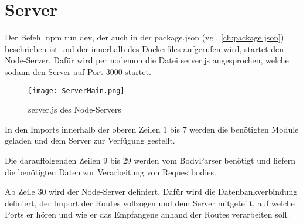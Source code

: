 
\chapter{Server}
\label{ch:Server}

Der Befehl \glqq npm run dev\grqq{}, der auch in der \glqq package.json\grqq{} (vgl. \autoref{ch:package.json}) beschrieben ist und der innerhalb des Dockerfiles aufgerufen wird, startet den Node-Server. Dafür wird per \glqq nodemon\grqq{} die Datei \glqq server.js\grqq{} angesprochen, welche sodann den Server auf Port 3000 startet.

\begin{figure}[h]
\centering
\texttt{[image: ServerMain.png]}
\vspace{1pt}
\caption{server.js des Node-Servers}
\label{fig:server.js des Node-Servers}
\end{figure}


In den Imports innerhalb der oberen Zeilen 1 bis 7 werden die benötigten Module geladen und dem Server zur Verfügung gestellt.

Die darauffolgenden Zeilen 9 bis 29 werden vom \glqq BodyParser\grqq{} benötigt und liefern die benötigten Daten zur Verarbeitung von Requestbodies.

Ab Zeile 30 wird der Node-Server definiert. Dafür wird die Datenbankverbindung definiert, der Import der Routes vollzogen und dem Server mitgeteilt, auf welche Ports er hören und wie er das Empfangene anhand der Routes verarbeiten soll.